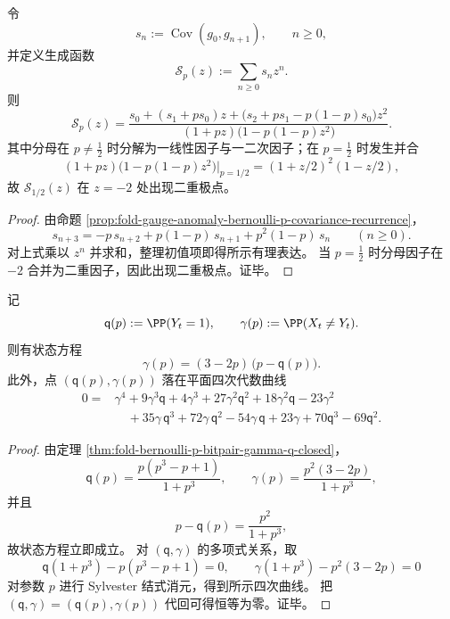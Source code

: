 \begin{theorem}[自协方差生成函数的完全有理性与临界二重极点]\label{thm:fold-bernoulli-p-autocovariance-generating-rational}
令
\[
s_n:=\operatorname{Cov}(g_0,g_{n+1}),\qquad n\ge 0,
\]
并定义生成函数
\[
\mathcal S_p(z):=\sum_{n\ge 0}s_n z^n.
\]
则
\[
\mathcal S_p(z)=
\frac{s_0+(s_1+p s_0)z+\bigl(s_2+p s_1-p(1-p)s_0\bigr)z^2}
{(1+p z)\bigl(1-p(1-p)z^2\bigr)}.
\]
其中分母在 \(p\neq\tfrac12\) 时分解为一线性因子与一二次因子；在 \(p=\tfrac12\) 时发生并合
\[
(1+p z)\bigl(1-p(1-p)z^2\bigr)\Big|_{p=1/2}
=(1+z/2)^2(1-z/2),
\]
故 \(\mathcal S_{1/2}(z)\) 在 \(z=-2\) 处出现二重极点。
\end{theorem}
\begin{proof}
由命题 \ref{prop:fold-gauge-anomaly-bernoulli-p-covariance-recurrence}，
\[
s_{n+3}
=-p\,s_{n+2}+p(1-p)\,s_{n+1}+p^2(1-p)\,s_n\qquad(n\ge 0).
\]
对上式乘以 \(z^n\) 并求和，整理初值项即得所示有理表达。
当 \(p=\tfrac12\) 时分母因子在 \(-2\) 合并为二重因子，因此出现二重极点。证毕。
\end{proof}

\begin{theorem}\label{thm:fold-bernoulli-p-output-mismatch-elimination-curve}
记
\[
\mathsf q(p):=\PP(Y_t=1),\qquad
\gamma(p):=\PP(X_t\neq Y_t).
\]
则有状态方程
\[
\gamma(p)=(3-2p)\,\bigl(p-\mathsf q(p)\bigr).
\]
此外，点 \((\mathsf q(p),\gamma(p))\) 落在平面四次代数曲线
\[
\begin{aligned}
0={}&\gamma^{4}+9\gamma^{3}\mathsf q+4\gamma^{3}
+27\gamma^{2}\mathsf q^{2}+18\gamma^{2}\mathsf q-23\gamma^{2}\\
&\quad+35\gamma\,\mathsf q^{3}+72\gamma\,\mathsf q^{2}-54\gamma\,\mathsf q+23\gamma
+70\mathsf q^{3}-69\mathsf q^{2}.
\end{aligned}
\]
\end{theorem}
\begin{proof}
由定理 \ref{thm:fold-bernoulli-p-bitpair-gamma-q-closed}，
\[
\mathsf q(p)=\frac{p(p^3-p+1)}{1+p^3},\qquad
\gamma(p)=\frac{p^2(3-2p)}{1+p^3},
\]
并且
\[
p-\mathsf q(p)=\frac{p^2}{1+p^3},
\]
故状态方程立即成立。
对 \((\mathsf q,\gamma)\) 的多项式关系，取
\[
\mathsf q(1+p^3)-p(p^3-p+1)=0,\qquad
\gamma(1+p^3)-p^2(3-2p)=0
\]
对参数 \(p\) 进行 Sylvester 结式消元，得到所示四次曲线。
把 \((\mathsf q,\gamma)=(\mathsf q(p),\gamma(p))\) 代回可得恒等为零。证毕。
\end{proof}

